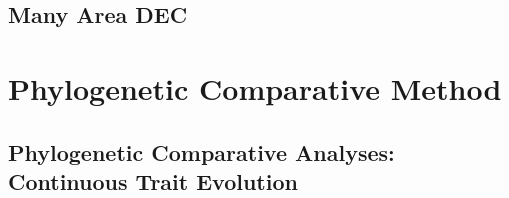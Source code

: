 \documentclass[11pt]{book}
\begin{document}
\chapter{Many Area DEC}
\def \ResourcePath {RB_Biogeography_many_area_Tutorial/}








\part{Phylogenetic Comparative Method}
\chapter{Phylogenetic Comparative Analyses: Continuous Trait Evolution}
\def \ResourcePath {RB_PhyloComparative_Tutorial/}

\end{document}

